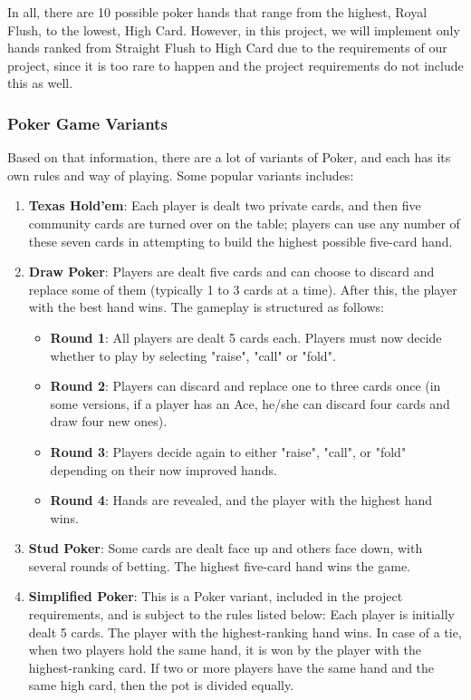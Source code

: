 \hspace{1cm} In all, there are 10 possible poker hands that range from the highest, Royal Flush, to the lowest, High Card. However, in this project, we will implement only hands ranked from Straight Flush to High Card due to the requirements of our project, since it is too rare to happen and the project requirements do not include this as well.

\subsubsection{Poker Game Variants}
\label{subsubsec:poker-game-variants}

\hspace{1cm} Based on that information, there are a lot of variants of Poker, and each has its own rules and way of playing. Some popular variants includes:

\begin{enumerate}
    \item \textbf{Texas Hold'em}: Each player is dealt two private cards, and then five community cards are turned over on the table; players can use any number of these seven cards in attempting to build the highest possible five-card hand.
    \item \textbf{Draw Poker}: Players are dealt five cards and can choose to discard and replace some of them (typically 1 to 3 cards at a time). After this, the player with the best hand wins. The gameplay is structured as follows:
    \begin{itemize}
        \item \textbf{Round 1}: All players are dealt 5 cards each. Players must now decide whether to play by selecting "raise", "call" or "fold".
        \item \textbf{Round 2}: Players can discard and replace one to three cards once (in some versions, if a player has an Ace, he/she can discard four cards and draw four new ones).
        \item \textbf{Round 3}: Players decide again to either "raise", "call", or "fold" depending on their now improved hands.
        \item \textbf{Round 4}: Hands are revealed, and the player with the highest hand wins.
    \end{itemize}
    \item \textbf{Stud Poker}: Some cards are dealt face up and others face down, with several rounds of betting. The highest five-card hand wins the game.
    \item \textbf{Simplified Poker}: This is a Poker variant, included in the project requirements, and is subject to the rules listed below: Each player is initially dealt 5 cards. The player with the highest-ranking hand wins. In case of a tie, when two players hold the same hand, it is won by the player with the highest-ranking card. If two or more players have the same hand and the same high card, then the pot is divided equally.
\end{enumerate}

